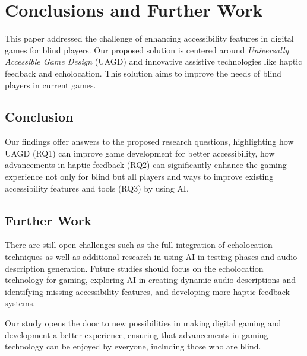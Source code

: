 \documentclass[sigconf,natbib=false,10pt]{acmart}
\begin{document}
	\section{Conclusions and Further Work}
	This paper addressed the challenge of enhancing accessibility features in digital games for blind players.
	Our proposed solution is centered around \emph{Universally Accessible Game Design} (UAGD) and innovative assistive technologies like haptic feedback and echolocation.
	This solution aims to improve the needs of blind players in current games.
	
	\subsection{Conclusion}
	Our findings offer answers to the proposed research questions, highlighting how UAGD (RQ1) can improve game development for better accessibility, how advancements in haptic feedback (RQ2) can significantly enhance the gaming experience not only for blind but all players and ways to improve existing accessibility features and tools (RQ3) by using AI.
	
	\subsection{Further Work}
	There are still open challenges such as the full integration of echolocation techniques as well as additional research in using AI in testing phases and audio description generation.
	Future studies should focus on the echolocation technology for gaming, exploring AI in creating dynamic audio descriptions and identifying missing accessibility features, and developing more haptic feedback systems.
	
	Our study opens the door to new possibilities in making digital gaming and development a better experience, ensuring that advancements in gaming technology can be enjoyed by everyone, including those who are blind.
	
	\printbibliography
	
\end{document}
